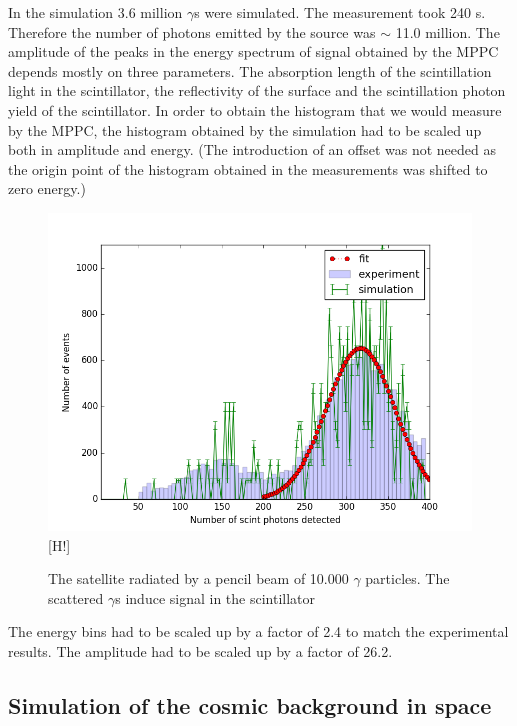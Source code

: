 \documentclass[12pt, a4paper,titlepage]{article}
\numberwithin{equation}{section}
\numberwithin{figure}{section}
\begin{document}
In the simulation 3.6 million $\gamma$s were simulated. The measurement took 240 s. Therefore the number of photons emitted by the source was $\sim$ 11.0 million. The amplitude of the peaks in the energy spectrum of signal obtained by the MPPC depends mostly on three parameters. The absorption length of the scintillation light in the scintillator, the reflectivity of the surface and the scintillation photon yield of the scintillator. In order to obtain the histogram that we would measure by the MPPC, the histogram obtained by the simulation had to be scaled up both in amplitude and energy. (The introduction of an offset was not needed as the origin point of the histogram obtained in the measurements was shifted to zero energy.)

\begin{figure}
\includegraphics[width=150.0mm]{images/calibration_photon_yield.png}[H!]
\caption{The satellite radiated by a pencil beam of 10.000 $\gamma$ particles. The scattered $\gamma$s induce signal in the scintillator}
\end{figure}

The energy bins had to be scaled up by a factor of 2.4 to match the experimental results. The amplitude had to be scaled up by a factor of 26.2.

\pagebreak



\subsection{Simulation of the cosmic background in space}
\end{document}
